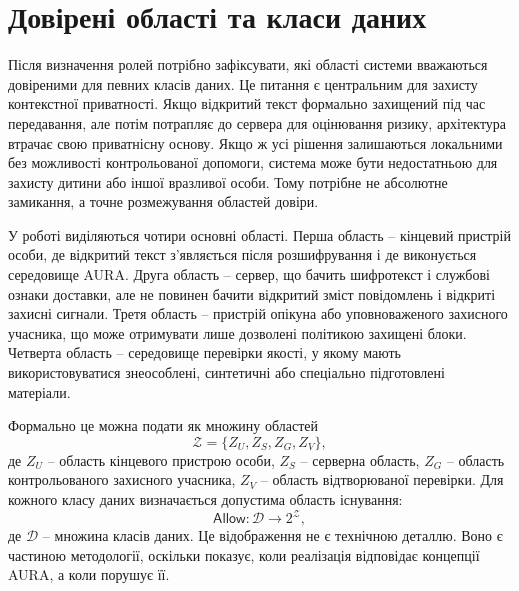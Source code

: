 \section{Довірені області та класи даних}
\label{sec:trust-zones}

Після визначення ролей потрібно зафіксувати, які області системи вважаються довіреними для певних класів даних. Це питання є центральним для захисту контекстної приватності. Якщо відкритий текст формально захищений під час передавання, але потім потрапляє до сервера для оцінювання ризику, архітектура втрачає свою приватнісну основу. Якщо ж усі рішення залишаються локальними без можливості контрольованої допомоги, система може бути недостатньою для захисту дитини або іншої вразливої особи. Тому потрібне не абсолютне замикання, а точне розмежування областей довіри.

У роботі виділяються чотири основні області. Перша область -- кінцевий пристрій особи, де відкритий текст з'являється після розшифрування і де виконується середовище AURA. Друга область -- сервер, що бачить шифротекст і службові ознаки доставки, але не повинен бачити відкритий зміст повідомлень і відкриті захисні сигнали. Третя область -- пристрій опікуна або уповноваженого захисного учасника, що може отримувати лише дозволені політикою захищені блоки. Четверта область -- середовище перевірки якості, у якому мають використовуватися знеособлені, синтетичні або спеціально підготовлені матеріали.

Формально це можна подати як множину областей
\begin{equation}
  \mathcal{Z} =
  \{Z_U, Z_S, Z_G, Z_V\},
  \label{eq:trust-zones}
\end{equation}
де \(Z_U\) -- область кінцевого пристрою особи, \(Z_S\) -- серверна область, \(Z_G\) -- область контрольованого захисного учасника, \(Z_V\) -- область відтворюваної перевірки. Для кожного класу даних визначається допустима область існування:
\begin{equation}
  \mathsf{Allow}: \mathcal{D} \rightarrow 2^{\mathcal{Z}},
  \label{eq:data-allow}
\end{equation}
де \(\mathcal{D}\) -- множина класів даних. Це відображення не є технічною деталлю. Воно є частиною методології, оскільки показує, коли реалізація відповідає концепції AURA, а коли порушує її.

